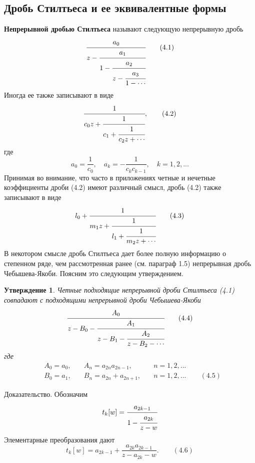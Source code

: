 \documentclass[12pt,a4paper]{article}
\theoremstyle{plain}   \newtheorem{Pro}{Задача}
\newtheorem{Sta}{Утверждение}
\begin{document}
\subsection{Дробь Стилтьеса и ее эквивалентные формы}
{\bfseries Непрерывной дробью Стилтьеса}
называют следующую непрерывную
дробь
\begin{equation*}
  \cfrac{a_0}{z-
    \cfrac{a_1}{1-
	  \cfrac{a_2}{z-
	    \cfrac{a_3}{1-\dotsb
  }}}}
  \qquad (4.1)
\end{equation*}
Иногда ее также записывают в виде
\begin{equation*}
  \cfrac{1}{c_0 z+
    \cfrac{1}{c_1 +
	  \cfrac{1}{c_2 z+\dotsb
  }}},
  \qquad (4.2)
\end{equation*}
где
\begin{equation*}
  a_0 =\frac{1}{c_0}, \quad
  a_k =-\frac{1}{c_k c_{k-1}}, \quad k=1,2,...
\end{equation*}
Принимая во внимание, что часто в приложениях
четные и нечетные коэффициенты дроби (4.2) имеют
различный смысл, дробь (4.2) также записывают в виде
\begin{equation*}
  l_0 +
    \cfrac{1}{m_1 z+
	  \cfrac{1}{l_1 +
	    \cfrac{1}{m_2 z+ \dotsb
	}}}
	\qquad (4.3)
\end{equation*}
В некотором смысле дробь Стилтьеса дает более полную
информацию о степенном ряде, чем рассмотренная ранее
(см. параграф 1.5) непрерывная дробь Чебышева-Якоби.
Поясним это следующим утверждением.
\begin{Sta}
Четные подходящие непрерывной дроби Стилтьеса (4.1)
совпадают с подходящими непрерывной дроби Чебышева-Якоби
\begin{equation*}
  \cfrac{A_0}{z-B_0 -
    \cfrac{A_1}{z-B_1 -
	  \cfrac{A_2}{z-B_2 - \dotsb
  }}}
  \qquad (4.4)
\end{equation*}
где
\begin{align*}
  & A_0 =a_0 , \quad & A_n =a_{2n}a_{2n-1}, \quad & n=1,2,...\\
  & B_0 =a_1 , \quad & B_n =a_{2n}+a_{2n+1}, \quad & n=1,2,...
  \qquad (4.5)
\end{align*}
\end{Sta}
{\Large Доказательство.}
Обозначим
\begin{equation*}
  t_k [w]=\cfrac{a_{2k-1}}{1-
            \cfrac{a_{2k}}{z-w}}
\end{equation*}
Элементарные преобразования дают
\begin{equation*}
  t_k [w]=a_{2k-1}+
  \frac{a_{2k}a_{2k-1}}{z-a_{2k}-w}.
  \qquad (4.6)
\end{equation*}
\end{document}
